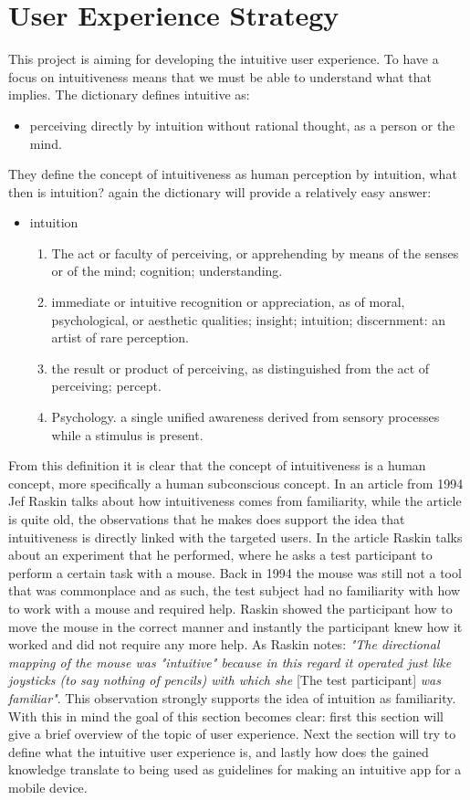 \section{User Experience Strategy}
\label{UserExperiene}
This project is aiming for developing the intuitive user experience. To have a focus on intuitiveness means that we must be able to understand what that 
implies. The dictionary defines intuitive as: 
\begin{itemize}
\item perceiving directly by intuition without rational thought, as a person or the mind.
\end{itemize}
They define the concept of intuitiveness as human perception by intuition, what 
then is intuition? again the dictionary will provide a relatively easy answer: 
\begin{itemize}
\item intuition\\
\begin{enumerate}
\item The act or faculty of perceiving, or apprehending by means of the senses or 
of the mind; cognition; understanding.
\item immediate or intuitive recognition or appreciation, as of moral, 
psychological, or aesthetic qualities; insight; intuition; discernment:
an artist of rare perception.
\item the result or product of perceiving, as distinguished from the act of 
perceiving; percept.
\item Psychology. a single unified awareness derived from sensory processes while 
a stimulus is present.
\end{enumerate}
\end{itemize} From this definition it is clear that the concept of intuitiveness is a human concept, more specifically a human subconscious concept. In an article from 1994 Jef Raskin\cite{JRaskin} talks about how intuitiveness comes from familiarity, while the article is quite old, the observations that he makes does support the idea that intuitiveness is directly linked with the targeted users. 
In the article Raskin talks about an experiment that he performed, where he asks a test participant to perform a certain task with a mouse. Back in 1994 the mouse 
was still not a tool that was commonplace and as such, the test subject had no familiarity with how to work with a mouse and required help. Raskin showed the 
participant how to move the mouse in the correct manner and instantly the participant knew how it worked and did not require any more help. As Raskin notes: \textit{"The directional mapping of the mouse was "intuitive" because in this regard it operated just like joysticks (to say nothing of pencils) with which she} [The test participant] \textit{was familiar"}.
\cite{JRaskin} This observation strongly supports the idea of intuition as familiarity. With this in mind the goal of this section becomes clear: first this section will give a brief overview of the topic of user experience. Next the section will try to define what the intuitive user experience is, and lastly how 
does the gained knowledge translate to being used as guidelines for making an intuitive app for a mobile device.  

